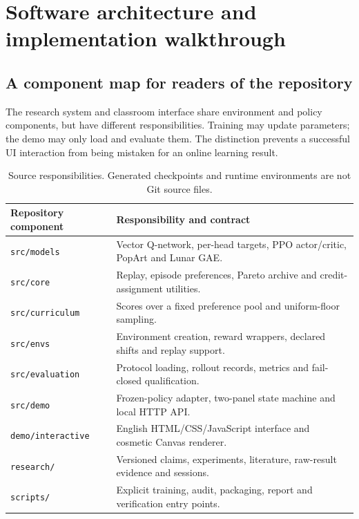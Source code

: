 \clearpage
\section{Software architecture and implementation walkthrough}
\label{sec:software}

\subsection{A component map for readers of the repository}
The research system and classroom interface share environment and policy
components, but have different responsibilities. Training may update parameters;
the demo may only load and evaluate them. The distinction prevents a successful
UI interaction from being mistaken for an online learning result.

\begin{table}[htbp]\centering\small
\begin{tabularx}{\textwidth}{lY}\toprule
Repository component & Responsibility and contract\\\midrule
\texttt{src/models} & Vector Q-network, per-head targets, PPO actor/critic, PopArt and Lunar GAE.\\
\texttt{src/core} & Replay, episode preferences, Pareto archive and credit-assignment utilities.\\
\texttt{src/curriculum} & Scores over a fixed preference pool and uniform-floor sampling.\\
\texttt{src/envs} & Environment creation, reward wrappers, declared shifts and replay support.\\
\texttt{src/evaluation} & Protocol loading, rollout records, metrics and fail-closed qualification.\\
\texttt{src/demo} & Frozen-policy adapter, two-panel state machine and local HTTP API.\\
\texttt{demo/interactive} & English HTML/CSS/JavaScript interface and cosmetic Canvas renderer.\\
\texttt{research/} & Versioned claims, experiments, literature, raw-result evidence and sessions.\\
\texttt{scripts/} & Explicit training, audit, packaging, report and verification entry points.\\\bottomrule
\end{tabularx}
\caption{Source responsibilities. Generated checkpoints and runtime environments are not Git source files.}
\end{table}

